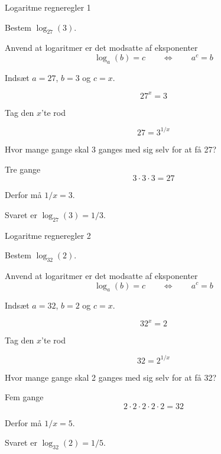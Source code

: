 \documentclass{article}
\begin{document}
\tableofcontents
\newpage

\begin{exercise}{Logaritme regneregler 1}

Bestem $\log_{27}(3)$.


\hint

Anvend at logaritmer er det modsatte af eksponenter
\[
\log_a(b) = c \qquad \Leftrightarrow \qquad a^c = b
\]

\hint

Indsæt $a=27$, $b=3$ og $c=x$.

\hint
\[
27^x = 3
\]

\hint
Tag den $x$'te rod

\hint
\[
27 = 3^{1/x}
\]

\hint
Hvor mange gange skal 3 ganges med sig selv for at få 27?

\hint
Tre gange
\[
3 \cdot 3 \cdot 3 = 27
\]

\hint
Derfor må $1/x = 3$.

\hint
Svaret er $\log_{27}(3) = 1/3$.

\end{exercise}

\newpage

\begin{exercise}{Logaritme regneregler 2}
	
	Bestem $\log_{32}(2)$.
	
	
	\hint
	
	Anvend at logaritmer er det modsatte af eksponenter
	\[
	\log_a(b) = c \qquad \Leftrightarrow \qquad a^c = b
	\]
	
	\hint
	
	Indsæt $a=32$, $b=2$ og $c=x$.
	
	\hint
	\[
	32^x = 2
	\]
	
	\hint
	Tag den $x$'te rod
	
	\hint
	\[
	32 = 2^{1/x}
	\]
	
	\hint
	Hvor mange gange skal 2 ganges med sig selv for at få 32?
	
	\hint
	Fem gange
	\[
	2 \cdot 2 \cdot 2 \cdot 2 \cdot 2 = 32
	\]
	
	\hint
	Derfor må $1/x = 5$.
	
	\hint
	Svaret er $\log_{32}(2) = 1/5$.
	
\end{exercise}
\end{document}

